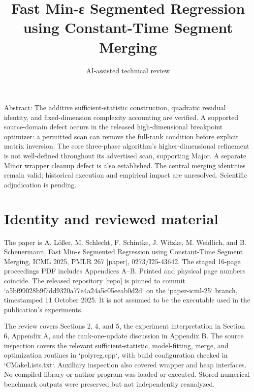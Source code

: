 \documentclass[10pt]{article}
\title{Fast Min-ε Segmented Regression using Constant-Time Segment Merging}
\author{AI-assisted technical review}
\date{}
\begin{document}
\maketitle
Abstract: The additive sufficient-statistic construction, quadratic residual identity, and fixed-dimension complexity accounting are verified. A supported source-domain defect occurs in the released high-dimensional breakpoint optimizer: a permitted scan can remove the full-rank condition before explicit matrix inversion. The core three-phase algorithm’s higher-dimensional refinement is not well-defined throughout its advertised scan, supporting Major. A separate Minor wrapper cleanup defect is also established. The central merging identities remain valid; historical execution and empirical impact are unresolved. Scientific adjudication is pending.\par
\section*{Identity and reviewed material}
The paper is A. Lößer, M. Schlecht, F. Schintke, J. Witzke, M. Weidlich, and B. Scheuermann, Fast Min-\(\epsilon\) Segmented Regression using Constant-Time Segment Merging, ICML 2025, PMLR 267 [paper], 0273/I25-43642. The staged 16-page proceedings PDF includes Appendices A–B. Printed and physical page numbers coincide. The released repository [repo] is pinned to commit `a5bf99028b9f7dd9320a77e4a24a5c05eeab0d2d` on the `paper-icml-25` branch, timestamped 11 October 2025. It is not assumed to be the executable used in the publication’s experiments.\par
The review covers Sections 2, 4, and 5, the experiment interpretation in Section 6, Appendix A, and the rank-one-update discussion in Appendix B. The source inspection covers the relevant sufficient-statistic, model-fitting, merge, and optimization routines in `polyreg.cpp`, with build configuration checked in `CMakeLists.txt`. Auxiliary inspection also covered wrapper and heap interfaces. No compiled library or author program was loaded or executed. Stored numerical benchmark outputs were preserved but not independently reanalyzed.\par
\end{document}
